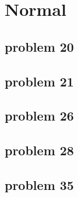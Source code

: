 \section{Normal}

\subsection{problem 20}

\subsection{problem 21}

\subsection{problem 26}

\subsection{problem 28}

\subsection{problem 35}

